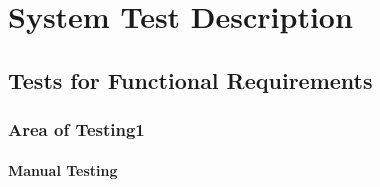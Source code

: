 \documentclass[12pt, titlepage]{article}
\begin{document}
\section{System Test Description}
	
\subsection{Tests for Functional Requirements}

\subsubsection{Area of Testing1}
		
\paragraph{Manual Testing}
\end{document}
